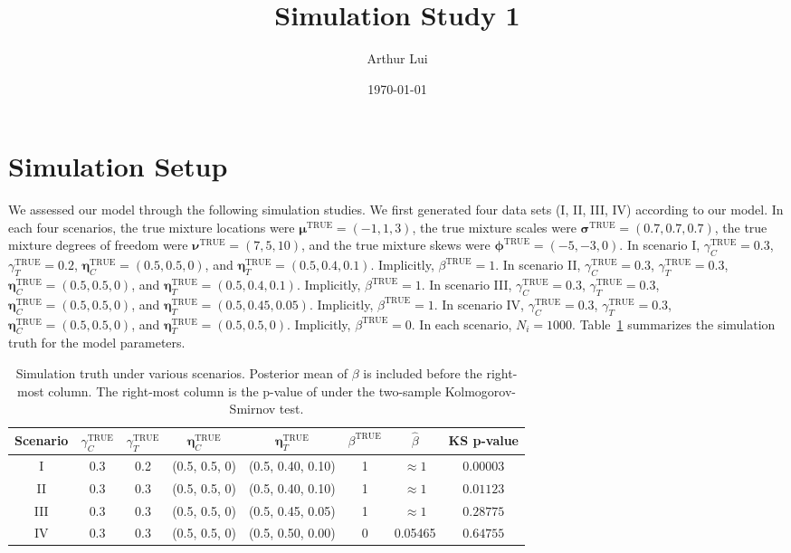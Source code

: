 \documentclass[12pt]{article} %
\title{Simulation Study 1}
\author{Arthur Lui}
\date{\today} %
\newcommand{\true}{\text{TRUE}}
\begin{document}
\maketitle

\section{Simulation Setup}\label{sec:sim-setup}
We assessed our model through the following simulation studies. We first
generated four data sets (I, II, III, IV) according to our model. In each
four scenarios,
%
the true mixture locations were $\bm{\mu}^\true=(-1, 1, 3)$,
the true mixture scales were $\bm{\sigma}^\true=(0.7, 0.7, 0.7)$,
the true mixture degrees of freedom were $\bm{\nu}^\true=(7, 5, 10)$, and
the true mixture skews were $\bm{\phi}^\true=(-5, -3, 0)$.
%
In scenario I, $\gamma_C^\true=0.3$, $\gamma_T^\true=0.2$, $\bm\eta_C^\true=(0.5,
0.5, 0)$, and $\bm\eta_T^\true=(0.5,0.4,0.1)$. Implicitly, $\beta^\true=1$.
In scenario II, $\gamma_C^\true=0.3$, $\gamma_T^\true=0.3$, $\bm\eta_C^\true=(0.5,
0.5, 0)$, and $\bm\eta_T^\true=(0.5,0.4,0.1)$. Implicitly, $\beta^\true=1$.
In scenario III, $\gamma_C^\true=0.3$, $\gamma_T^\true=0.3$, $\bm\eta_C^\true=(0.5,
0.5, 0)$, and $\bm\eta_T^\true=(0.5,0.45,0.05)$. Implicitly, $\beta^\true=1$.
In scenario IV, $\gamma_C^\true=0.3$, $\gamma_T^\true=0.3$, $\bm\eta_C^\true=(0.5,
0.5, 0)$, and $\bm\eta_T^\true=(0.5,0.5,0)$. Implicitly, $\beta^\true=0$.
%
In each scenario, $N_i=1000$. Table~\ref{tab:sim-truth} summarizes the
simulation truth for the model parameters.
\begin{table}
  \centering
  \begin{tabular}{|c|ccccccc|}
    \hline 
    Scenario & $\gamma_C^\true$ & $\gamma_T^\true$ & $\bm\eta_C^\true$ & 
    $\bm\eta_T^\true$ & $\beta^\true$ & $\hat\beta$ & KS p-value \\
    \hline 
    I   & 0.3 & 0.2 & (0.5, 0.5, 0) & (0.5, 0.40, 0.10) & 1 & $\approx 1$ & $0.00003$ \\
    II  & 0.3 & 0.3 & (0.5, 0.5, 0) & (0.5, 0.40, 0.10) & 1 & $\approx 1$ & $0.01123$ \\
    III & 0.3 & 0.3 & (0.5, 0.5, 0) & (0.5, 0.45, 0.05) & 1 & $\approx 1$ & $0.28775$ \\
    IV  & 0.3 & 0.3 & (0.5, 0.5, 0) & (0.5, 0.50, 0.00) & 0 &     0.05465 & $0.64755$ \\
    \hline
  \end{tabular}
  \caption{Simulation truth under various scenarios. Posterior mean of
  $\beta$ is included before the right-most column. The right-most column
  is the p-value of under the two-sample Kolmogorov-Smirnov test.}
  \label{tab:sim-truth}
\end{table}
\end{document}
